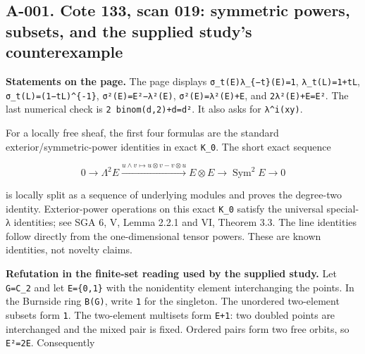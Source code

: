 \documentclass[
  10pt,
]{article}
\begin{document}
\subsection{A-001. Cote 133, scan 019: symmetric powers, subsets, and
the supplied study's
counterexample}\label{a-001.-cote-133-scan-019-symmetric-powers-subsets-and-the-supplied-studys-counterexample}

\textbf{Statements on the page.} The page displays
\texttt{\small σ\_\allowbreak{}t(\allowbreak{}E)\allowbreak{}λ\_\allowbreak{}\{−t\}(\allowbreak{}E)\allowbreak{}=\allowbreak{}1},
\texttt{\small λ\_\allowbreak{}t(\allowbreak{}L)\allowbreak{}=\allowbreak{}1+\allowbreak{}tL},
\texttt{\small σ\_\allowbreak{}t(\allowbreak{}L)\allowbreak{}=\allowbreak{}(\allowbreak{}1−tL)\allowbreak{}\textasciicircum{}\{-\allowbreak{}1\}},
\texttt{\small σ²(\allowbreak{}E)\allowbreak{}=\allowbreak{}E²−λ²(\allowbreak{}E)\allowbreak{}},
\texttt{\small σ²(\allowbreak{}E)\allowbreak{}=\allowbreak{}λ²(\allowbreak{}E)\allowbreak{}+\allowbreak{}E},
and
\texttt{\small 2λ²(\allowbreak{}E)\allowbreak{}+\allowbreak{}E=\allowbreak{}E²}.
The last numerical check is
\texttt{\small 2 binom(\allowbreak{}d,\allowbreak{}2)\allowbreak{}+\allowbreak{}d=\allowbreak{}d²}.
It also asks for
\texttt{\small λ\textasciicircum{}i(\allowbreak{}xy)\allowbreak{}}.

For a locally free sheaf, the first four formulas are the standard
exterior/symmetric-power identities in exact
\texttt{\small K\_\allowbreak{}0}. The short exact sequence

\[
0\longrightarrow\Lambda^2E\xrightarrow{u\wedge v\mapsto u\otimes v-v\otimes u}
E\otimes E\longrightarrow\operatorname{Sym}^2E\longrightarrow0
\]

is locally split as a sequence of underlying modules and proves the
degree-two identity. Exterior-power operations on this exact
\texttt{\small K\_\allowbreak{}0} satisfy the universal special-λ
identities; see SGA 6, V, Lemma 2.2.1 and VI, Theorem 3.3. The line
identities follow directly from the one-dimensional tensor powers. These
are known identities, not novelty claims.

\textbf{Refutation in the finite-set reading used by the supplied
study.} Let \texttt{\small G=\allowbreak{}C\_\allowbreak{}2} and let
\texttt{\small E=\allowbreak{}\{0,\allowbreak{}1\}} with the nonidentity
element interchanging the points. In the Burnside ring
\texttt{\small B(\allowbreak{}G)\allowbreak{}}, write \texttt{\small 1}
for the singleton. The unordered two-element subsets form
\texttt{\small 1}. The two-element multisets form
\texttt{\small E+\allowbreak{}1}: two doubled points are interchanged
and the mixed pair is fixed. Ordered pairs form two free orbits, so
\texttt{\small E²=\allowbreak{}2E}. Consequently
\end{document}
